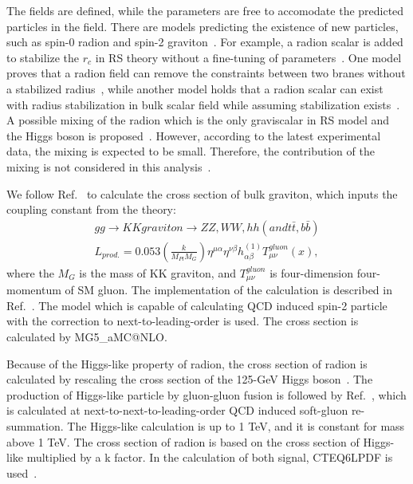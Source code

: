 The fields are defined, while the parameters are free to accomodate the predicted particles in the field. There are models predicting the existence of new particles, such as spin-0 radion and spin-2 graviton~\citep{Davoudiasl:1999jd,Agashe:2007zd,Fitzpatrick:2007qr}. For example, a radion scalar is added to stabilize the $r_c$ in RS theory without a fine-tuning of parameters~\citep{Goldberger:1999uk}. One model proves that
a radion field can remove the constraints between two branes without a stabilized radius~\citep{Csaki:1999mp}, while another model holds that 
a radion scalar can exist with radius stabilization in bulk scalar field while assuming stabilization exists~\citep{Csaki:2000zn}.
A possible mixing of the radion which is the only graviscalar in RS model and the Higgs boson is proposed~\citep{Giudice:2000av}.
However, according to the latest experimental data, the mixing is expected to be small. Therefore, the contribution of the mixing is not considered in this analysis~\citep{Desai:2013pga}.

We follow Ref.~\citep{Agashe:2013kyb} to calculate the cross section of bulk graviton, which inputs the coupling constant from the theory: 
\begin{equation} 
\begin{split}
gg \rightarrow KK graviton \rightarrow ZZ, WW, hh (and t\bar{t}, b\bar{b}) \\
\textit{L}_{prod.} = 0.053 (\frac{k}{M_{Pl}M_{G}})\eta^{\mu\alpha}\eta^{\nu\beta}h^{(1)}_{\alpha\beta}T^{gluon}_{\mu \nu}(x), 
\end{split}
\end{equation}
where the $M_G$ is the mass of KK graviton, and $T^{gluon}_{\mu \nu}$ is four-dimension four-momentum of SM gluon. The implementation of the calculation is described in Ref.~\citep{Oliveira:2014kla}. The model which is capable of calculating QCD induced spin-2 particle with the correction to next-to-leading-order is used. The cross section is calculated by \textsf{MG5\_aMC@NLO}.

Because of the Higgs-like property of radion, the cross section of radion is calculated by rescaling the cross section of the 125-GeV Higgs boson~\citep{Agashe:2013kyb,AN-16-300}. The production of Higgs-like particle by gluon-gluon fusion is followed by Ref.~\citep{Catani:2003zt,Heinemeyer:2013tqa}, which is calculated at next-to-next-to-leading-order QCD induced soft-gluon re-summation. The Higgs-like calculation is up to 1 TeV, and it is constant for mass above 1 TeV. The cross section of radion is based on the cross section of Higgs-like multiplied by a k factor. 
In the calculation of both signal, CTEQ6LPDF is used~\citep{Nadolsky:2008zw}.  

